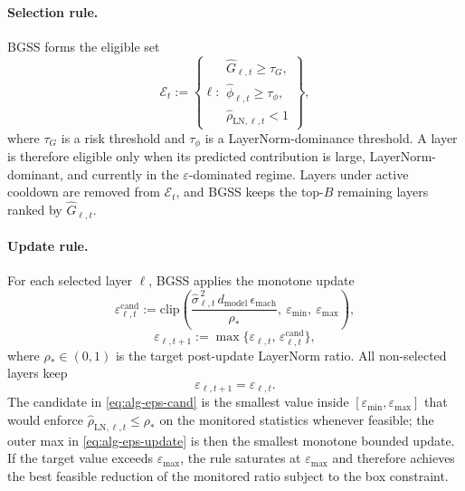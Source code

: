 \documentclass[twoside]{article}
\theoremstyle{definition}
\theoremstyle{remark}
\begin{document}
\paragraph{Selection rule.}
BGSS forms the eligible set
\[
\mathcal{E}_t
:=
\left\{
\ell:
\begin{array}{l}
\widehat{G}_{\ell,t}\ge\tau_G,\\
\widehat{\phi}_{\ell,t}\ge\tau_\phi,\\
\widehat{\rho}_{\mathrm{LN},\ell,t}<1
\end{array}
\right\},
\]
where $\tau_G$ is a risk threshold and $\tau_\phi$ is a LayerNorm-dominance
threshold. A layer is therefore eligible only when its predicted contribution is
large, LayerNorm-dominant, and currently in the $\varepsilon$-dominated regime.
Layers under active cooldown are removed from $\mathcal{E}_t$, and BGSS keeps
the top-$B$ remaining layers ranked by $\widehat{G}_{\ell,t}$.

\paragraph{Update rule.}
For each selected layer $\ell$, BGSS applies the monotone update
\begin{equation}
\label{eq:alg-eps-cand}
\varepsilon^{\mathrm{cand}}_{\ell,t}
:=
\mathrm{clip}\!\left(
\frac{\widehat{\sigma}_{\ell,t}^{\,2}\,d_{\mathrm{model}}\,\epsilon_{\mathrm{mach}}}{\rho_*},
\ \varepsilon_{\min},\ \varepsilon_{\max}
\right),
\end{equation}
\begin{equation}
\label{eq:alg-eps-update}
\varepsilon_{\ell,t+1}
:=
\max\!\bigl\{
\varepsilon_{\ell,t},\,
\varepsilon^{\mathrm{cand}}_{\ell,t}
\bigr\},
\end{equation}
where $\rho_* \in (0,1)$ is the target post-update LayerNorm ratio.
All non-selected layers keep
\[
\varepsilon_{\ell,t+1} = \varepsilon_{\ell,t}.
\]
The candidate in \eqref{eq:alg-eps-cand} is the smallest value inside
$[\varepsilon_{\min},\varepsilon_{\max}]$ that would enforce
$\widehat{\rho}_{\mathrm{LN},\ell,t}\le \rho_*$ on the monitored statistics
whenever feasible; the outer max in \eqref{eq:alg-eps-update} is then the
smallest monotone bounded update. If the target value exceeds
$\varepsilon_{\max}$, the rule saturates at $\varepsilon_{\max}$ and therefore
achieves the best feasible reduction of the monitored ratio subject to the box
constraint.
\end{document}
